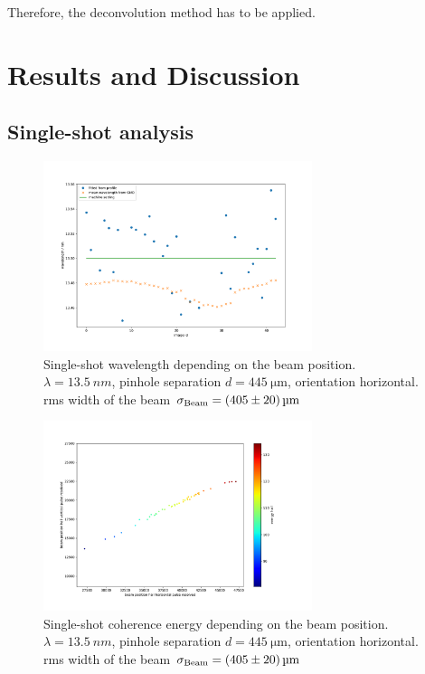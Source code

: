 \documentclass{osa-article}
\begin{document}
Therefore, the deconvolution method has to be applied.


\section{Results and Discussion}

\subsection{Single-shot analysis}

\begin{figure}[htbp]
    \centering
    \includegraphics[width=0.7\textwidth]{gfx/13p5nm_S_445um/wavelength_FLASH2_USER1-2017-11-29T1007.pdf}
    \caption{Single-shot wavelength depending on the beam position. $\lambda=\SI{13.5}{nm}$, pinhole separation $d=\SI{445}{\micro\meter}$, orientation horizontal. rms width of the beam $\sigma_{\textup{Beam}} = \SI[separate-uncertainty=true]{405(20)}{\micro\meter}$}
    \label{fig:13p5nm_S_445um_wavelength_FLASH2_USER1-2017-11-29T1007}
\end{figure}

\begin{figure}[htbp]
    \centering
    \includegraphics[width=0.7\textwidth]{gfx/13p5nm_S_445um/energy_vs_position_FLASH2_USER1-2017-11-29T1007.pdf}
    \caption{Single-shot coherence energy depending on the beam position. $\lambda=\SI{13.5}{nm}$, pinhole separation $d=\SI{445}{\micro\meter}$, orientation horizontal. rms width of the beam $\sigma_{\textup{Beam}} = \SI[separate-uncertainty=true]{405(20)}{\micro\meter}$}
    \label{fig:13p5nm_S_445um_energy_vs_position_FLASH2_USER1-2017-11-29T1007}
\end{figure}
\end{document}
